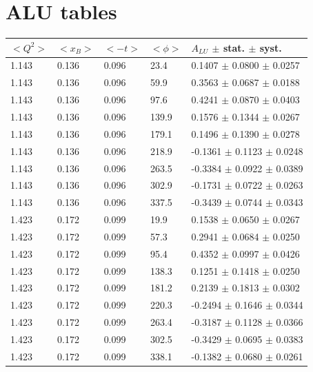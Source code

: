 \chapter{ALU tables}
\begin{table}[!h]
   \begin{center}
      \begin{tabular}{||l|l|l|l|l||}
         \hline
 $<Q^{2}>$ & $<x_{B}>$ & $<-t>$ & $<\phi>$ & $A_{LU}$ $\pm$ stat. $\pm$ syst.\\
         \hline
  1.143 & 0.136 & 0.096 &  23.4  &  0.1407   $\pm$ 0.0800   $\pm$  0.0257 \\
  1.143 & 0.136 & 0.096 &  59.9  &  0.3563   $\pm$ 0.0687   $\pm$  0.0188 \\
  1.143 & 0.136 & 0.096 &  97.6  &  0.4241   $\pm$ 0.0870   $\pm$  0.0403 \\
  1.143 & 0.136 & 0.096 &  139.9 &  0.1576   $\pm$ 0.1344   $\pm$  0.0267 \\
  1.143 & 0.136 & 0.096 &  179.1 &  0.1496   $\pm$ 0.1390   $\pm$  0.0278 \\
  1.143 & 0.136 & 0.096 &  218.9 & -0.1361   $\pm$ 0.1123   $\pm$  0.0248 \\
  1.143 & 0.136 & 0.096 &  263.5 & -0.3384   $\pm$ 0.0922   $\pm$  0.0389 \\
  1.143 & 0.136 & 0.096 &  302.9 & -0.1731   $\pm$ 0.0722   $\pm$  0.0263 \\
  1.143 & 0.136 & 0.096 &  337.5 & -0.3439   $\pm$ 0.0744   $\pm$  0.0343 \\
  \hline                                                           
  1.423 & 0.172 & 0.099 &  19.9  &  0.1538   $\pm$ 0.0650   $\pm$  0.0267 \\
  1.423 & 0.172 & 0.099 &  57.3  &  0.2941   $\pm$ 0.0684   $\pm$  0.0250 \\
  1.423 & 0.172 & 0.099 &  95.4  &  0.4352   $\pm$ 0.0997   $\pm$  0.0426 \\
  1.423 & 0.172 & 0.099 &  138.3 &  0.1251   $\pm$ 0.1418   $\pm$  0.0250 \\
  1.423 & 0.172 & 0.099 &  181.2 &  0.2139   $\pm$ 0.1813   $\pm$  0.0302 \\
  1.423 & 0.172 & 0.099 &  220.3 & -0.2494   $\pm$ 0.1646   $\pm$  0.0344 \\
  1.423 & 0.172 & 0.099 &  263.4 & -0.3187   $\pm$ 0.1128   $\pm$  0.0366 \\
  1.423 & 0.172 & 0.099 &  302.5 & -0.3429   $\pm$ 0.0695   $\pm$  0.0383 \\
  1.423 & 0.172 & 0.099 &  338.1 & -0.1382   $\pm$ 0.0680   $\pm$  0.0261 \\

\end{tabular}
\end{center}
\end{table}
